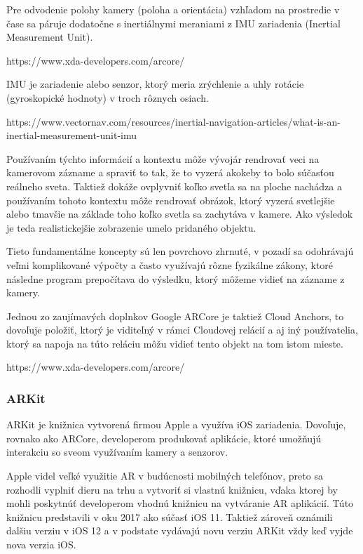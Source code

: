Pre odvodenie polohy kamery (poloha a orientácia) vzhľadom na prostredie v čase sa páruje dodatočne s inertiálnymi meraniami z IMU zariadenia (Inertial Measurement Unit). 

https://www.xda-developers.com/arcore/

IMU je zariadenie alebo senzor, ktorý meria zrýchlenie a uhly rotácie (gyroskopické hodnoty) v troch rôznych osiach. 

https://www.vectornav.com/resources/inertial-navigation-articles/what-is-an-inertial-measurement-unit-imu

Používaním týchto informácií a kontextu môže vývojár rendrovať veci na kamerovom zázname a spraviť to tak, že to vyzerá akokeby to bolo súčasťou reálneho sveta. Taktiež dokáže ovplyvniť koľko svetla sa na ploche nachádza a používaním tohoto kontextu môže rendrovať obrázok, ktorý vyzerá svetlejšie alebo tmavšie na základe toho koľko svetla sa zachytáva v kamere. Ako výsledok je teda realistickejšie zobrazenie umelo pridaného objektu.

Tieto fundamentálne koncepty sú len povrchovo zhrnuté, v pozadí sa odohrávajú veľmi komplikované výpočty a často využívajú rôzne fyzikálne zákony, ktoré následne program prepočítava do výsledku, ktorý môžeme vidieť na zázname z kamery.

Jednou zo zaujímavých doplnkov Google ARCore je taktiež Cloud Anchors, to dovoľuje položiť, ktorý je viditeľný v rámci Cloudovej relácií a aj iný používatelia, ktorý sa napoja na túto reláciu môžu vidieť tento objekt na tom istom mieste.

https://www.xda-developers.com/arcore/

\subsubsection{ARKit}

ARKit je knižnica vytvorená firmou Apple a využíva iOS zariadenia. Dovoľuje, rovnako ako ARCore, developerom produkovať aplikácie, ktoré umožňujú interakciu so sveom využívaním kamery a senzorov. 

Apple videl veľké využitie AR v budúcnosti mobilných telefónov, preto sa rozhodli vyplniť dieru na trhu a vytvoriť si vlastnú knižnicu, vďaka ktorej by mohli poskytnúť developerom vhodnú knižnicu na vytváranie AR aplikácií. Túto knižnicu predstavili v oku 2017 ako súčasť iOS 11. Taktiež zároveň oznámili dalšiu verziu v iOS 12 a v podstate vydávajú novu verziu ARKit vždy keď vyjde nova verzia iOS. 

